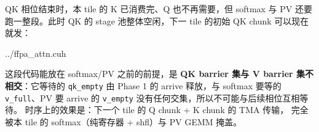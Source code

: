 QK 相位结束时，本 tile 的 K 已消费完、Q 也不再需要，但 softmax 与
PV 还要跑一整段。此时 QK 的 stage 池整体空闲，下一 tile 的初始
QK chunk 可以现在就发：

\begin{lstinputlisting}[linerange={1083-1094},firstnumber=auto,
  title={ffpa\_attn.cuh L1083-1094（跨 tile 预取：下一 tile 的 QK 初始 chunk）}]{../ffpa_attn.cuh}
\end{lstinputlisting}

这段代码能放在 softmax/PV 之前的前提，是 \textbf{QK barrier 集与
V barrier 集不相交}：它等待的 \texttt{qk\_empty} 由 Phase 1 的 arrive
释放，与 softmax 要等的 \texttt{v\_full}、PV 要 arrive 的
\texttt{v\_empty} 没有任何交集，所以不可能与后续相位互相等待。
时序上的效果是：下一个 tile 的 Q chunk + K chunk 的 TMA 传输，
完全被本 tile 的 softmax（纯寄存器 + shfl）与 PV GEMM 掩盖。


